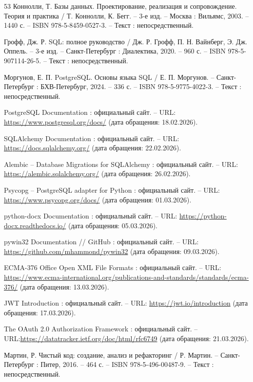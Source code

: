 \begin{thebibliography}{53}
	Коннолли, Т. Базы данных. Проектирование, реализация и сопровождение. Теория и практика / Т. Коннолли, К. Бегг. – 3-е изд. – Москва : Вильямс, 2003. – 1440 с. – ISBN 978-5-8459-0527-3. – Текст : непосредственный.
	
	Грофф, Дж. Р. SQL: полное руководство / Дж. Р. Грофф, П. Н. Вайнберг, Э. Дж. Оппель. – 3-е изд. – Санкт-Петербург : Диалектика, 2020. – 960 с. – ISBN 978-5-907114-26-5. – Текст : непосредственный.
	
	Моргунов, Е. П. PostgreSQL. Основы языка SQL / Е. П. Моргунов. – Санкт-Петербург : БХВ-Петербург, 2024. – 336 с. – ISBN 978-5-9775-4022-3. – Текст : непосредственный.
	
	PostgreSQL Documentation : официальный сайт. – URL: \url{https://www.postgresql.org/docs/} (дата обращения: 18.02.2026).
	
	SQLAlchemy Documentation : официальный сайт. – URL: \url{https://docs.sqlalchemy.org/} (дата обращения: 22.02.2026).
	
	Alembic – Database Migrations for SQLAlchemy : официальный сайт. – URL: \url{https://alembic.sqlalchemy.org/} (дата обращения: 26.02.2026).
	
	Psycopg – PostgreSQL adapter for Python : официальный сайт. – URL: \url{https://www.psycopg.org/docs/} (дата обращения: 01.03.2026).
	
	python-docx Documentation : официальный сайт. – URL: \url{https://python-docx.readthedocs.io/} (дата обращения: 05.03.2026).
	
	pywin32 Documentation // GitHub : официальный сайт. – URL: \url{https://github.com/mhammond/pywin32} (дата обращения: 09.03.2026).
	
	ECMA-376 Office Open XML File Formats : официальный сайт. – URL: \url{https://www.ecma-international.org/publications-and-standards/standards/ecma-376/} (дата обращения: 13.03.2026).
	
	JWT Introduction : официальный сайт. – URL: \url{https://jwt.io/introduction} (дата обращения: 17.03.2026).
	
	The OAuth 2.0 Authorization Framework : официальный сайт. – URL:\url{https://datatracker.ietf.org/doc/html/rfc6749} (дата обращения: 21.03.2026).
	
	Мартин, Р. Чистый код: создание, анализ и рефакторинг / Р. Мартин. – Санкт-Петербург : Питер, 2016. – 464 с. – ISBN 978-5-496-00487-9. – Текст : непосредственный.
	

\end{thebibliography}
